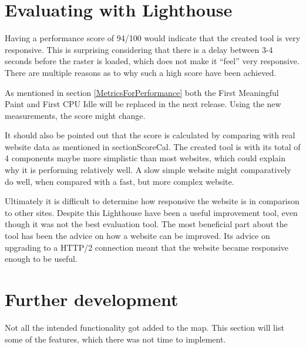 \section{Evaluating with Lighthouse}

Having a performance score of 94/100 would indicate that the created tool is very responsive. This is surprising considering that there is a delay between 3-4 seconds before the raster is loaded, which does not make it “feel” very responsive. There are multiple reasons as to why such a high score have been achieved.

As mentioned in section \ref{MetricsForPerformance} both the First Meaningful Paint and First CPU Idle will be replaced in the next release. Using the new measurements, the score might change.

It should also be pointed out that the score is calculated by comparing with real website data as mentioned in section{ScoreCal}. The created tool is with its total of 4 components maybe more simplistic than most websites, which could explain why it is performing relatively well. A slow simple website might comparatively do well, when compared with a fast, but more complex website.

Ultimately it is difficult to determine how responsive the website is in comparison to other sites. Despite this Lighthouse have been a useful improvement tool, even though it was not the best evaluation tool. The most beneficial part about the tool has been the advice on how a website can be improved. Its advice on upgrading to a HTTP/2 connection meant that the website became responsive enough to be useful. 

\section{Further development}
Not all the intended functionality got added to the map. This section will list some of the features, which there was not time to implement. 
%

